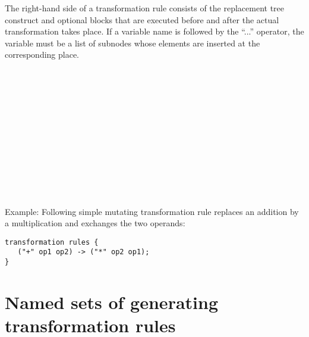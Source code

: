 \noindent
The right-hand side of a transformation rule consists of the replacement
tree construct and optional blocks that are executed before and after
the actual transformation takes place.  If a variable name is followed
by the ``...'' operator, the variable must be a list of subnodes whose
elements are inserted at the corresponding place.

\begin{grammar}
      \produces {} \nextline
	  \nextline
	  \\
      \produces {} \\
      \produces {}  \\
      \produces {} \\
      \produces \lextoken{\{}  \lextoken{\}} \\
      \produces \lextoken{(} 
	 \lextoken{)} \\
      \produces \lextoken{(} 
	  \lextoken{)} \\
      \produces {} \\
      \produces {}
	  \\
      \produces {} \\
      \produces {} \\
\end{grammar}

\noindent
Example: Following simple mutating transformation rule replaces
an addition by a multiplication and exchanges the two operands:

\begin{lstlisting}
transformation rules {
   ("+" op1 op2) -> ("*" op2 op1);
}
\end{lstlisting}

\section{Named sets of generating transformation rules}\label{named-trrules}

